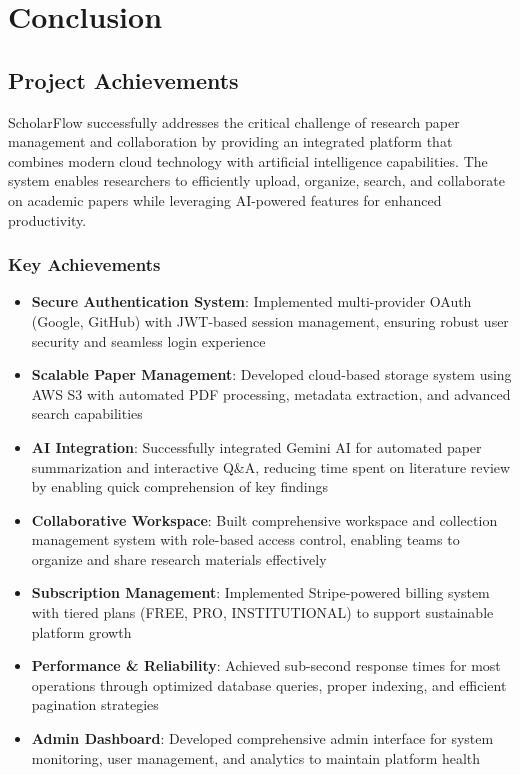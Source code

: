 \chapter{Conclusion}
\label{ch:conclusion}

\section{Project Achievements}
\label{sec:conclusion-achievements}

ScholarFlow successfully addresses the critical challenge of research paper management and collaboration by providing an integrated platform that combines modern cloud technology with artificial intelligence capabilities. The system enables researchers to efficiently upload, organize, search, and collaborate on academic papers while leveraging AI-powered features for enhanced productivity.


\subsection{Key Achievements}

\begin{itemize}[leftmargin=*,topsep=3pt,itemsep=2pt]
    \item \textbf{Secure Authentication System}: Implemented multi-provider OAuth (Google, GitHub) with JWT-based session management, ensuring robust user security and seamless login experience
    
    \item \textbf{Scalable Paper Management}: Developed cloud-based storage system using AWS S3 with automated PDF processing, metadata extraction, and advanced search capabilities
    
    \item \textbf{AI Integration}: Successfully integrated Gemini AI for automated paper summarization and interactive Q\&A, reducing time spent on literature review by enabling quick comprehension of key findings
    
    \item \textbf{Collaborative Workspace}: Built comprehensive workspace and collection management system with role-based access control, enabling teams to organize and share research materials effectively
    
    \item \textbf{Subscription Management}: Implemented Stripe-powered billing system with tiered plans (FREE, PRO, INSTITUTIONAL) to support sustainable platform growth
    
    \item \textbf{Performance \& Reliability}: Achieved sub-second response times for most operations through optimized database queries, proper indexing, and efficient pagination strategies
    
    \item \textbf{Admin Dashboard}: Developed comprehensive admin interface for system monitoring, user management, and analytics to maintain platform health
\end{itemize}

